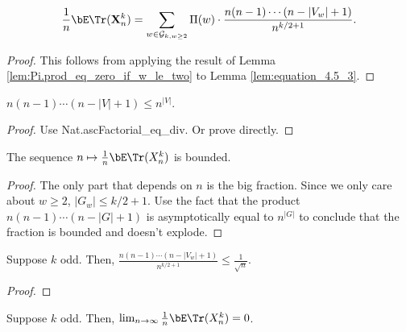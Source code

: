 \begin{lemma}[Simplifying the summation with the fact $\Pi (G,w) = 0$ in certain cases: R-1-16 : lem:equation\_4.8]
  \label{lem:equation_4.8}
  \[
  \frac{1}{n} \bE \Tr (\mathbf{X}_n^k)
  = \sum_{w \in \mathcal{G}_{k, w \geq 2}} \Pi (w) \cdot \frac{n (n-1) \cdots (n - |V_w| + 1)}{n^{k/2+1}}.
  \]

\end{lemma}

\begin{proof}
  This follows from applying the result of Lemma \ref{lem:Pi.prod_eq_zero_if_w_le_two} to Lemma \ref{lem:equation_4.5_3}.
\end{proof}


\begin{lemma}
  \label{lem:asc_factorial_product}
  $n(n-1)\cdots (n-|V|+1) \le n^{|V|}$.
\end{lemma}

\begin{proof}
  Use Nat.ascFactorial\_eq\_div. Or prove directly.
\end{proof}


\begin{lemma}
  \label{lem:bounded_map}
  The sequence $n\mapsto \frac1n\bE\Tr(X_n^k)$ is bounded.
\end{lemma}

\begin{proof}
  \notready
  The only part that depends on $n$ is the big fraction. Since we only care about $w \ge 2$, $|G_w| \le k/2 + 1$.
  Use the fact that the product $n(n-1)\cdots (n-|G|+1)$ is asymptotically equal to $n^{|G|}$ to
  conclude that the fraction is bounded and doesn't explode.
\end{proof}


\begin{lemma}
  \label{lem:odd_ratio_bound}
  \notready
  Suppose $k$ odd. Then, $\frac{n(n-1)\cdots(n-|V_w|+1)}{n^{k/2+1}} \le \frac{1}{\sqrt{n}}$.
\end{lemma}

\begin{proof}
  \notready
\end{proof}


\begin{proposition}
  \label{prop:odd_case}
  \notready
  Suppose $k$ odd. Then, $\lim_{n\to\infty} \frac{1}{n}\bE\Tr(X_n^k) = 0$.
\end{proposition}

